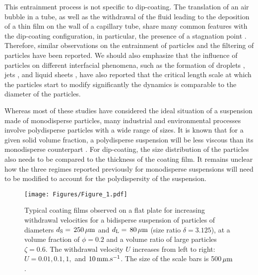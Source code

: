 \documentclass{jfm}
\begin{document}
This entrainment process is not specific to dip-coating. The translation of an air bubble in a tube, as well as the withdrawal of the fluid leading to the deposition of a thin film on the wall of a capillary tube, share many common features with the dip-coating configuration, in particular, the presence of a stagnation point  \cite[][]{bretherton1961motion,krechetnikov2010application}.
Therefore, similar observations on the entrainment of particles \cite[][]{jeong2020deposition,wu2021film} and the filtering of particles \cite[][]{yu2018separation} have been reported. 
We should also emphasize that the influence of particles on different interfacial phenomena, such as the formation of droplets \cite[][]{furbank2004experimental,bonnoit2012accelerated,chateau2018pinch,thievenaz2021pinch}, jets \cite[][]{chateau2019breakup}, and liquid sheets \cite[][]{raux2020spreading}, have also reported that the critical length scale at which the particles start to modify 
significantly the dynamics is comparable to the diameter of the particles.

Whereas most of these studies have considered the ideal situation of a suspension made of monodisperse particles, many industrial and environmental processes involve polydisperse particles with a wide range of sizes. It is known that for a given solid volume fraction, a polydisperse suspension will be less viscous
than its monodisperse counterpart \cite[][]{shapiro1992random}.
For dip-coating, the size distribution of the particles also needs to be compared to the thickness of the coating film. It remains unclear how the three regimes reported previously for monodisperse suspensions will need to be modified to account for the polydispersity of the suspension.

\begin{figure}
\centering
  \texttt{[image: Figures/Figure\_1.pdf]}
  \caption{Typical coating films observed on a flat plate for increasing withdrawal velocities
    for a bidisperse suspension of particles of diameters $d_{\rm S}=\,250\,\mu{\rm m}$ and 
    $d_{\rm L}=\,80\,\mu{\rm m}$ (size ratio $\delta=3.125$), 
    at a volume fraction of $\phi=0.2$ and a volume ratio of large particles $\zeta=0.6$.
    The withdrawal velocity $U$ increases from left to right: 
    $U=0.01, 0.1, 1,$ and $10\,{\rm mm.s^{-1}}$.
    The size of the scale bars is 500$\,\mu\rm{m}$.}
  \label{fgr:Figure_1}
\end{figure}
\end{document}
